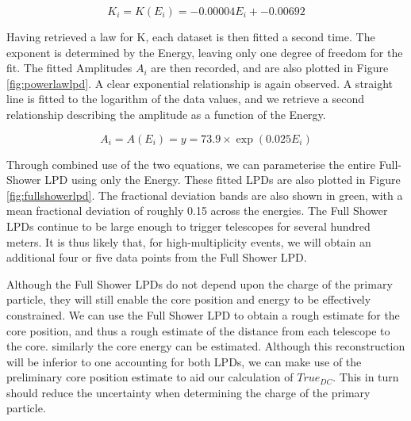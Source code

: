 \documentclass{article}
\begin{document}
\[ K_{i} = K(E_{i}) = -0.00004 E_{i} + -0.00692 \]

Having retrieved a law for K, each dataset is then fitted a second time. The exponent is determined by the Energy, leaving only one degree of freedom for the fit. The fitted Amplitudes $A_{i}$ are then recorded, and are also plotted in Figure \ref{fig:powerlawlpd}. A clear exponential relationship is again observed. A straight line is fitted to the logarithm of the data values, and we retrieve a second relationship describing the amplitude as a function of the Energy.

\[ A_{i} = A(E_{i}) =y =73.9 \times \exp (0.025 E_{i}) \]

Through combined use of the two equations, we can parameterise the entire Full-Shower LPD using only the Energy. These fitted LPDs are also plotted in Figure \ref{fig:fullshowerlpd}. The fractional deviation bands are also shown in green, with a mean fractional deviation of roughly 0.15 across the energies. The Full Shower LPDs continue to be large enough to trigger telescopes for several hundred meters. It is thus likely that, for high-multiplicity events, we will obtain an additional four or five data points from the Full Shower LPD.

Although the Full Shower LPDs do not depend upon the charge of the primary particle, they will still enable the core position and energy to be effectively constrained. We can use the Full Shower LPD to obtain a rough estimate for the core position, and thus a rough estimate of the distance from each telescope to the core. similarly the core energy can be estimated. Although this reconstruction will be inferior to one accounting for both LPDs, we can make use of the preliminary core position estimate to aid our calculation of $True_{DC}$. This in turn should reduce the uncertainty when determining the charge of the primary particle.
\end{document}
